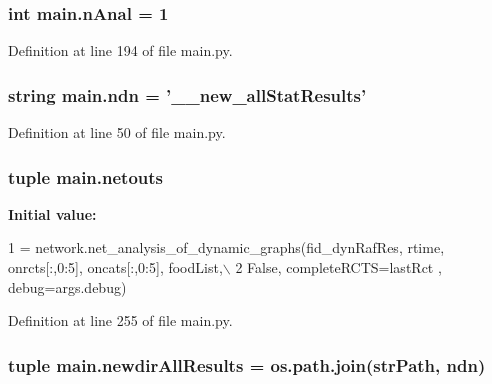 \hypertarget{a00122_ae7ca1c378927da05feb71e5a9f775afb}{
\subsubsection[{n\-Anal}]{\setlength{\rightskip}{0pt plus 5cm}int main.\-n\-Anal = 1}}\label{a00122_ae7ca1c378927da05feb71e5a9f775afb}


Definition at line 194 of file main.\-py.

\hypertarget{a00122_acaa3f6fffb18a543c7c04d985e77fa6f}{
\subsubsection[{ndn}]{\setlength{\rightskip}{0pt plus 5cm}string main.\-ndn = '\-\_\-\_\-new\-\_\-all\-Stat\-Results'}}\label{a00122_acaa3f6fffb18a543c7c04d985e77fa6f}


Definition at line 50 of file main.\-py.

\hypertarget{a00122_a02c2194d4e56d3d8c6d2c204a8017e3a}{
\subsubsection[{netouts}]{\setlength{\rightskip}{0pt plus 5cm}tuple main.\-netouts}}\label{a00122_a02c2194d4e56d3d8c6d2c204a8017e3a}
{\bfseries Initial value\-:}
\begin{DoxyCode}
1 = network.net\_analysis\_of\_dynamic\_graphs(fid\_dynRafRes, rtime, onrcts[:,0:5], oncats[:,0:5], foodList,\(\backslash\)
2                                                                                                                                                                 
         \textcolor{keyword}{False}, completeRCTS=lastRct , debug=args.debug)
\end{DoxyCode}


Definition at line 255 of file main.\-py.

\hypertarget{a00122_af73b43f5468097ae9443adeb6010a75c}{
\subsubsection[{newdir\-All\-Results}]{\setlength{\rightskip}{0pt plus 5cm}tuple main.\-newdir\-All\-Results = os.\-path.\-join({\bf str\-Path}, {\bf ndn})}}\label{a00122_af73b43f5468097ae9443adeb6010a75c}


